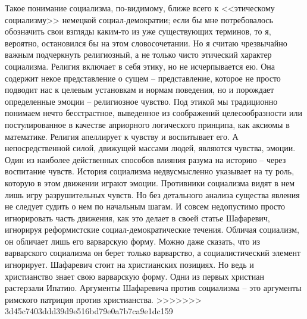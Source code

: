 \documentclass{book}
\begin{document}
Такое понимание социализма, по-видимому, ближе всего к <<этическому социализму>> немецкой социал-демократии; если бы мне потребовалось обозначить свои взгляды каким-то из уже существующих терминов, то я, вероятно, остановился бы на этом словосочетании. Но я считаю чрезвычайно важным под­черкнуть религиозный, а не только чисто этический характер социализма. Религия включает в себя этику, но не исчерпывает­ся ею. Она содержит некое представление о сущем -- представ­ление, которое не просто подводит нас к целевым установкам и нормам поведения, но и порождает определенные эмоции -- религиозное чувство. Под этикой мы традиционно понимаем нечто бесстрастное, выведенное из соображений целесообраз­ности или постулированное в качестве априорного логического принципа, как аксиомы в математике. Религия апеллирует к чувству и воспитывает его. А непосредственной силой, движу­щей массами людей, являются чувства, эмоции. Один из наибо­лее действенных способов влияния разума на историю -- через воспитание чувств. История 
социализма недвусмысленно указы­вает на ту роль, которую в этом движении играют эмоции. Про­тивники социализма видят в нем лишь игру разрушительных чувств. Но без детального анализа существа явления не следует судить о нем по начальным шагам. И совсем недопустимо про­сто игнорировать часть движения, как это делает в своей статье Шафаревич, игнорируя реформистские социал-демократические течения. Обличая социализм, он обличает лишь его варварскую форму. Можно даже сказать, что из варварского социализма он берет только варварство, а социалистический элемент игно­рирует. Шафаревич стоит на христианских позициях. Но ведь и христианство знает свою варварскую форму. Одни из первых христиан растерзали Ипатию. Аргументы Шафаревича против социализма -- это аргументы римского патриция против хри­стианства.
>>>>>>> 3d45c7403ddd39d9e516bd79e0a7b7ca9e1dc159
\end{document}
